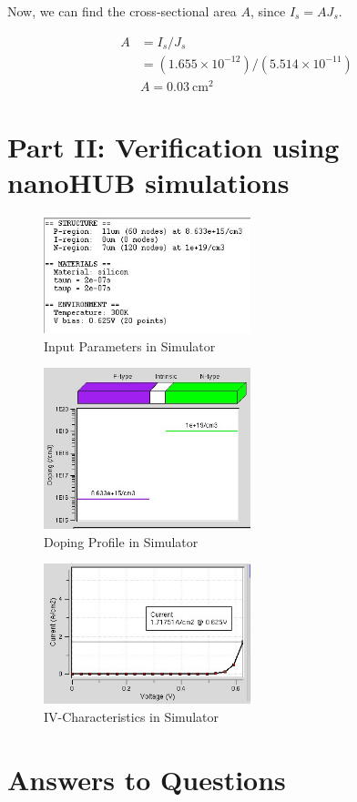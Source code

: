 \documentclass{IEEEtran}
\begin{document}
Now, we can find the cross-sectional area \(A\), since \(I_s = AJ_s\).

\begin{align*}
    A &= I_s / J_s \\ 
      &= (1.655\times10^{-12}) / (5.514\times10^{-11}) \\
      & \boxed{A = 0.03 ~ \text{cm}^2}
\end{align*}

\section*{Part II: Verification using nanoHUB simulations}

\begin{figure}[!ht] 
    \centering
    \includegraphics[width = 6cm]{inputs.jpg}
    \caption{Input Parameters in Simulator}
    \label{fig:inputs}
\end{figure}

\begin{figure}[!ht] 
    \centering
    \includegraphics[width = 6cm]{doping.jpg}
    \caption{Doping Profile in Simulator}
    \label{fig:doping}
\end{figure}

\begin{figure}[!ht] 
    \centering
    \includegraphics[width = 6cm]{current.jpg}
    \caption{IV-Characteristics in Simulator}
    \label{fig:current}
\end{figure}

\section*{Answers to Questions}



\end{document}
